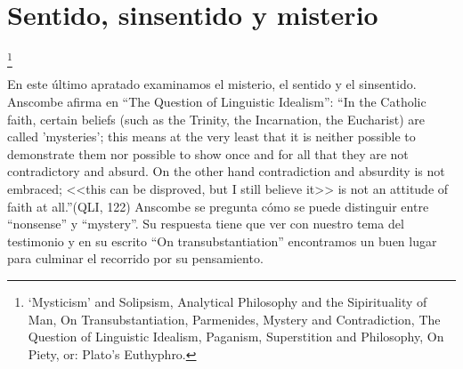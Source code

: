 \documentclass[../main.tex]{subfiles}
\begin{document}
\section{Sentido, sinsentido y misterio}
\footnote{
`Mysticism' and Solipsism, 
Analytical Philosophy and the Sipirituality of Man, 
On Transubstantiation, 
Parmenides, Mystery and Contradiction, 
The Question of Linguistic Idealism, 
Paganism, Superstition and Philosophy, 
On Piety, or: Plato's Euthyphro.
}

En este último apratado examinamos el misterio, el sentido y el sinsentido. Anscombe afirma en ``The Question of Linguistic Idealism'': ``In the Catholic faith, certain beliefs (such as the Trinity, the Incarnation, the Eucharist) are called 'mysteries'; this means at the very least that it is neither possible to demonstrate them nor possible to show once and for all that they are not contradictory and absurd. On the other hand contradiction and absurdity is not embraced; <<this can be disproved, but I still believe it>> is not an attitude of faith at all.''(QLI, 122) Anscombe se pregunta cómo se puede distinguir entre ``nonsense'' y ``mystery''. Su respuesta tiene que ver con nuestro tema del testimonio y en su escrito ``On transubstantiation'' encontramos un buen lugar para culminar el recorrido por su pensamiento.
\end{document}
